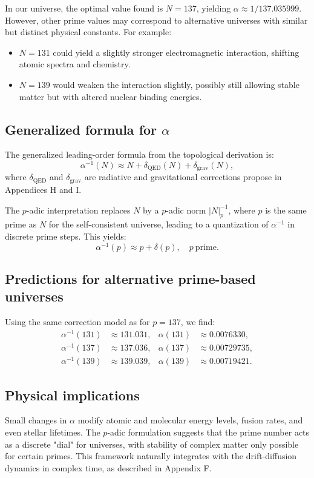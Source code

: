 In our universe, the optimal value found is $N = 137$, yielding $\alpha \approx 1/137.035999$. However, other prime values may correspond to alternative universes with similar but distinct physical constants. For example:
\begin{itemize}
\item $N = 131$ could yield a slightly stronger electromagnetic interaction, shifting atomic spectra and chemistry.
\item $N = 139$ would weaken the interaction slightly, possibly still allowing stable matter but with altered nuclear binding energies.
\end{itemize}

\subsection*{Generalized formula for $\alpha$}
The generalized leading-order formula from the topological derivation is:
\begin{equation}
\alpha^{-1}(N) \approx N + \delta_{\mathrm{QED}}(N) + \delta_{\mathrm{grav}}(N),
\end{equation}
where $\delta_{\mathrm{QED}}$ and $\delta_{\mathrm{grav}}$ are radiative and gravitational corrections propose in Appendices H and I.

The $p$-adic interpretation replaces $N$ by a $p$-adic norm $|N|_p^{-1}$, where $p$ is the same prime as $N$ for the self-consistent universe, leading to a quantization of $\alpha^{-1}$ in discrete prime steps. This yields:
\begin{equation}
\alpha^{-1}(p) \approx p + \delta(p), \quad p \ \text{prime}.
\end{equation}

\subsection*{Predictions for alternative prime-based universes}
Using the same correction model as for $p=137$, we find:
\begin{align*}
\alpha^{-1}(131) &\approx 131.031, & \alpha(131) &\approx 0.0076330, \\
\alpha^{-1}(137) &\approx 137.036, & \alpha(137) &\approx 0.00729735, \\
\alpha^{-1}(139) &\approx 139.039, & \alpha(139) &\approx 0.00719421.
\end{align*}

\subsection*{Physical implications}
Small changes in $\alpha$ modify atomic and molecular energy levels, fusion rates, and even stellar lifetimes. The $p$-adic formulation suggests that the prime number acts as a discrete "dial" for universes, with stability of complex matter only possible for certain primes. This framework naturally integrates with the drift-diffusion dynamics in complex time, as described in Appendix F.

